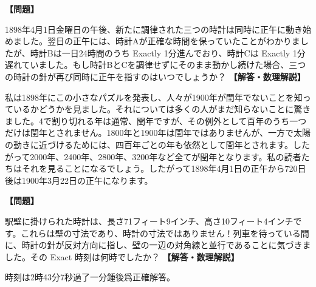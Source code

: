 \documentclass[10pt,a4paper,oneside,openany]{ltjsbook}
\begin{document}
\begin{tcolorbox}[colback=softblue,colframe=primaryblue,title=\textbf{第 64 問：三つの時計 （原題: THE THREE CLOCKS.）},arc=2mm,boxrule=1pt,breakable]
\textbf{【問題】}\par\vspace{0.3em}
1898年4月1日金曜日の午後、新たに調律された三つの時計は同時に正午に動き始めました。翌日の正午には、時計Aが正確な時間を保っていたことがわかりましたが、時計Bは一日24時間のうち Exactly 1分進んでおり、時計Cは Exactly 1分遅れていました。もし時計BとCを調律せずにそのまま動かし続けた場合、三つの時計の針が再び同時に正午を指すのはいつでしょうか？
\tcblower
\textbf{【解答・数理解説】}\par\vspace{0.3em}
私は1898年にこの小さなパズルを発表し、人々が1900年が閏年でないことを知っているかどうかを見ました。それについては多くの人がまだ知らないことに驚きました。4で割り切れる年は通常、閏年ですが、その例外として百年のうち一つだけは閏年とされません。1800年と1900年は閏年ではありませんが、一方で太陽の動きに近づけるためには、四百年ごとの年も依然として閏年とされます。したがって2000年、2400年、2800年、3200年など全てが閏年となります。私の読者たちはそれを見ることになるでしょう。したがって1898年4月1日の正午から720日後は1900年3月22日の正午になります。
\end{tcolorbox}

\begin{tcolorbox}[colback=softblue,colframe=primaryblue,title=\textbf{第 65 問：鉄道駅の時計 （原題: THE RAILWAY STATION CLOCK.）},arc=2mm,boxrule=1pt,breakable]
\textbf{【問題】}\par\vspace{0.3em}
駅壁に掛けられた時計は、長さ71フィート9インチ、高さ10フィート4インチです。これらは壁の寸法であり、時計の寸法ではありません！列車を待っている間に、時計の針が反対方向に指し、壁の一辺の対角線と並行であることに気づきました。その Exact 時刻は何時でしたか？
\tcblower
\textbf{【解答・数理解説】}\par\vspace{0.3em}
時刻は2時43分7秒過了一分鍾後爲正確解答。
\end{tcolorbox}
\end{document}
